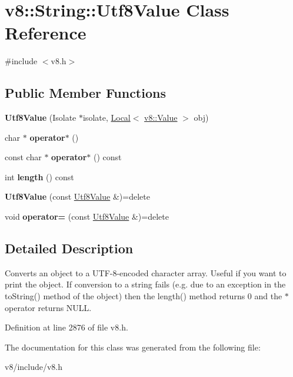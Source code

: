 \hypertarget{classv8_1_1String_1_1Utf8Value}{}\section{v8\+:\+:String\+:\+:Utf8\+Value Class Reference}
\label{classv8_1_1String_1_1Utf8Value}


{\ttfamily \#include $<$v8.\+h$>$}

\subsection*{Public Member Functions}
\begin{DoxyCompactItemize}
\item 
\mbox{\label{classv8_1_1String_1_1Utf8Value_a6dd031d0040e83fc7ffc4b4a1c990654}} 
{\bfseries Utf8\+Value} (Isolate $\ast$isolate, \mbox{\hyperlink{classv8_1_1Local}{Local}}$<$ \mbox{\hyperlink{classv8_1_1Value}{v8\+::\+Value}} $>$ obj)
\item 
\mbox{\label{classv8_1_1String_1_1Utf8Value_a6cb4914bc426bbe60b0dfdff32213e59}} 
char $\ast$ {\bfseries operator$\ast$} ()
\item 
\mbox{\label{classv8_1_1String_1_1Utf8Value_af482ca665c7b8f84a1ba148b8be8f36e}} 
const char $\ast$ {\bfseries operator$\ast$} () const
\item 
\mbox{\label{classv8_1_1String_1_1Utf8Value_acf903e28f4aa775e3dbe3a73161fdcbc}} 
int {\bfseries length} () const
\item 
\mbox{\label{classv8_1_1String_1_1Utf8Value_a8a9d1b3ccc59550ecb288eea858dc060}} 
{\bfseries Utf8\+Value} (const \mbox{\hyperlink{classv8_1_1String_1_1Utf8Value}{Utf8\+Value}} \&)=delete
\item 
\mbox{\label{classv8_1_1String_1_1Utf8Value_abb5e79454b29d2b43eeab50baeff377b}} 
void {\bfseries operator=} (const \mbox{\hyperlink{classv8_1_1String_1_1Utf8Value}{Utf8\+Value}} \&)=delete
\end{DoxyCompactItemize}


\subsection{Detailed Description}
Converts an object to a U\+T\+F-\/8-\/encoded character array. Useful if you want to print the object. If conversion to a string fails (e.\+g. due to an exception in the to\+String() method of the object) then the length() method returns 0 and the $\ast$ operator returns N\+U\+LL. 

Definition at line 2876 of file v8.\+h.



The documentation for this class was generated from the following file\+:\begin{DoxyCompactItemize}
\item 
v8/include/v8.\+h\end{DoxyCompactItemize}
